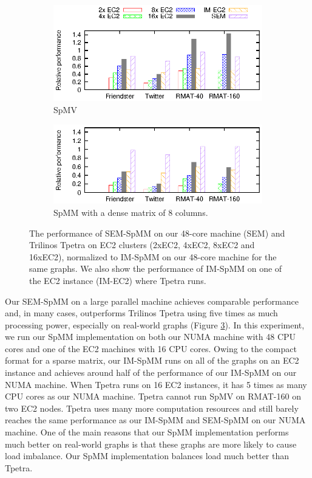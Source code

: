 \begin{figure}
	\footnotesize
	\centering
	\begin{subfigure}[b]{0.5\textwidth}
		\centering
		\includegraphics[scale=1]{SpMM_figs/SpMV-EC2.eps}
		\vspace{-5pt}
		\caption{SpMV}
		\label{perf:ec2:spmv}
	\end{subfigure}
	\begin{subfigure}[b]{0.5\textwidth}
		\centering
		\includegraphics[scale=1]{SpMM_figs/SpMM-EC2.eps}
		\vspace{-5pt}
		\caption{SpMM with a dense matrix of 8 columns.}
		\label{perf:ec2:spmm8}
	\end{subfigure}
	\vspace{3pt}
	\caption{The performance of SEM-SpMM on our 48-core machine (SEM) and
		Trilinos Tpetra on EC2 clusters (2xEC2, 4xEC2, 8xEC2 and 16xEC2),
		normalized to IM-SpMM on our 48-core machine for the same graphs.
		We also show the performance of IM-SpMM on
	one of the EC2 instance (IM-EC2) where Tpetra runs.}
	\label{perf:ec2}
\end{figure}

Our SEM-SpMM on a large parallel machine achieves comparable performance
and, in many cases, outperforms Trilinos Tpetra using five times
as much processing power, especially on
real-world graphs (Figure \ref{perf:ec2}). In this experiment, we run our
SpMM implementation on both our NUMA machine with 48 CPU cores
and one of the EC2 machines with 16 CPU cores. Owing to the compact format
for a sparse matrix, our IM-SpMM runs on all of the graphs on an EC2 instance
and achieves around half of the performance of our IM-SpMM on our NUMA machine.
When Tpetra runs on 16 EC2 instances, it has 5 times as many CPU cores as our
NUMA machine. Tpetra cannot run SpMV on RMAT-160 on two EC2 nodes.
Tpetra uses many more computation resources and still barely reaches
the same performance as our IM-SpMM and SEM-SpMM on our NUMA machine. One of
the main reasons that our SpMM implementation performs much
better on real-world graphs is that these graphs are more likely to cause
load imbalance. Our SpMM implementation balances load much better than Tpetra.

